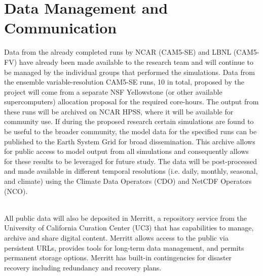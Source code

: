 \documentclass[11pt]{article}
\begin{document}
\appendix

\setcounter{section}{9}

\section{Data Management and Communication}

Data from the already completed runs by NCAR (CAM5-SE) and LBNL (CAM5-FV) have already been made available to the research team and will continue to be managed by the individual groups that performed the simulations. Data from the ensemble variable-resolution CAM5-SE runs, 10 in total, proposed by the project will come from a separate NSF Yellowstone (or other available supercomputers) allocation proposal for the required core-hours. The output from these runs will be archived on NCAR HPSS, where it will be available for community use. If during the proposed research certain simulations are found to be useful to the broader community, the model data for the specified runs can be published to the Earth System Grid for broad dissemination. This archive allows for public access to model output from all simulations and consequently allows for these results to be leveraged for future study.  The data will be post-processed and made available in different temporal resolutions (i.e. daily, monthly, seasonal, and climate) using the Climate Data Operators (CDO) and NetCDF Operators (NCO).

\ \\

\noindent All public data will also be deposited in Merritt, a repository service from the University of California Curation Center (UC3) that has capabilities to manage, archive and share digital content. Merritt allows access to the public via persistent URLs, provides tools for long-term data management, and permits permanent storage options. Merritt has built-in contingencies for disaster recovery including redundancy and recovery plans.

  
\end{document}
